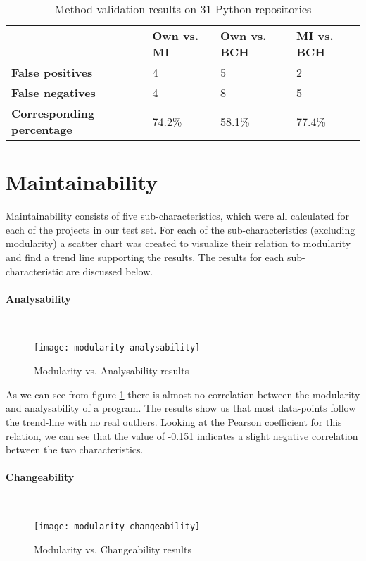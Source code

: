 \documentclass[twoside]{uva-inf-bachelor-thesis}
\newcommand{\myparagraph}[1]{\paragraph{#1}\mbox{}\\}
\begin{document}
\begin{table}[H]
\centering
\caption{Method validation results on 31 Python repositories}
\label{table:validation}
\begin{tabular}{llll}
\textbf{}                         & \textbf{Own vs. MI} & \textbf{Own vs. BCH} & \textbf{MI vs. BCH} \\ 
\textbf{False positives}          & 4                   & 5                    & 2                   \\
\textbf{False negatives}          & 4                   & 8                    & 5                   \\
\textbf{Corresponding percentage} & 74.2\%              & 58.1\%               & 77.4\%             
\end{tabular}
\end{table}

\section{Maintainability}
Maintainability consists of five sub-characteristics, which were all calculated for each of the projects in our test set. For each of the sub-characteristics (excluding modularity) a scatter chart was created to visualize their relation to modularity and find a trend line supporting the results. The results for each sub-characteristic are discussed below.

\myparagraph{Analysability}
\begin{figure}[H]
    \caption{Modularity vs. Analysability results}
    \label{figure:mod-analysis}
    \centering
        \texttt{[image: modularity-analysability]}
\end{figure}

As we can see from figure \ref{figure:mod-analysis} there is almost no correlation between the modularity and analysability of a program. The results show us that most data-points follow the trend-line with no real outliers. Looking at the Pearson coefficient for this relation, we can see that the value of -0.151 indicates a slight negative correlation between the two characteristics.

\myparagraph{Changeability}
\begin{figure}[H]
    \caption{Modularity vs. Changeability results}
    \label{figure:mod-change}
    \centering
        \texttt{[image: modularity-changeability]}
\end{figure}
\end{document}
